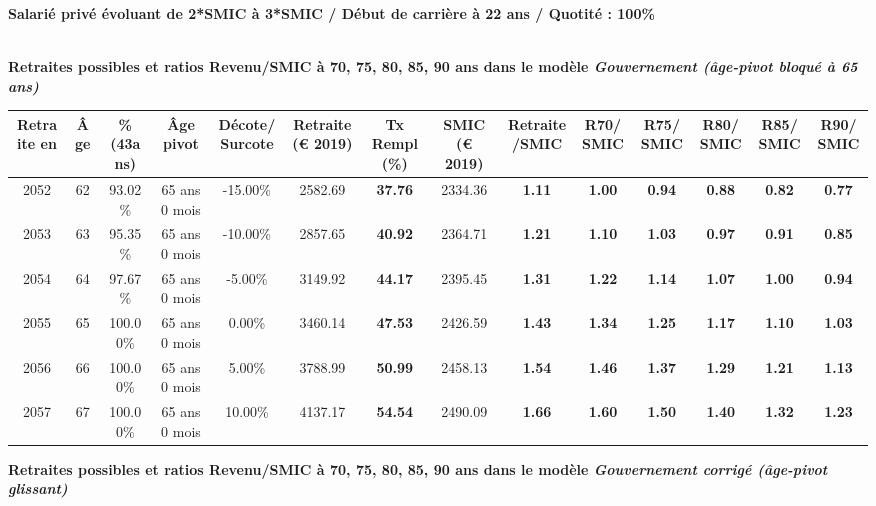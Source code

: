 {\bf \noindent Salarié privé évoluant de 2*SMIC à 3*SMIC / Début de carrière à 22 ans / Quotité : 100\%}  ~ 

 ~\\{\bf \noindent Retraites possibles et ratios Revenu/SMIC à 70, 75, 80, 85, 90 ans dans le modèle \emph{Gouvernement (âge-pivot bloqué à 65 ans)}}  
 
\begin{adjustbox}{max width=\textwidth} 
\begin{tabular}[htb]{|c|c||c|c|c||c|c||c|c||c|c|c|c|c|} 
\hline 
 Retraite en &  Âge &  \%(43ans) &  Âge pivot &  Décote/Surcote &  Retraite (\euro{} 2019) &  Tx Rempl(\%) &  SMIC (\euro{} 2019) &  Retraite/SMIC &  R70/SMIC &  R75/SMIC &  R80/SMIC &  R85/SMIC &  R90/SMIC \\ 
\hline \hline 
 2052 &  62 &  93.02\% &  65 ans 0 mois &  -15.00\% &  2582.69 &  {\bf 37.76} &  2334.36 &  {\bf 1.11} &  {\bf {\color{red} 1.00}} &  {\bf {\color{red} 0.94}} &  {\bf {\color{red} 0.88}} &  {\bf {\color{red} 0.82}} &  {\bf {\color{red} 0.77}} \\ 
\hline 
 2053 &  63 &  95.35\% &  65 ans 0 mois &  -10.00\% &  2857.65 &  {\bf 40.92} &  2364.71 &  {\bf 1.21} &  {\bf 1.10} &  {\bf 1.03} &  {\bf {\color{red} 0.97}} &  {\bf {\color{red} 0.91}} &  {\bf {\color{red} 0.85}} \\ 
\hline 
 2054 &  64 &  97.67\% &  65 ans 0 mois &  -5.00\% &  3149.92 &  {\bf 44.17} &  2395.45 &  {\bf 1.31} &  {\bf 1.22} &  {\bf 1.14} &  {\bf 1.07} &  {\bf 1.00} &  {\bf {\color{red} 0.94}} \\ 
\hline 
 2055 &  65 &  100.00\% &  65 ans 0 mois &  0.00\% &  3460.14 &  {\bf 47.53} &  2426.59 &  {\bf 1.43} &  {\bf 1.34} &  {\bf 1.25} &  {\bf 1.17} &  {\bf 1.10} &  {\bf 1.03} \\ 
\hline 
 2056 &  66 &  100.00\% &  65 ans 0 mois &  5.00\% &  3788.99 &  {\bf 50.99} &  2458.13 &  {\bf 1.54} &  {\bf 1.46} &  {\bf 1.37} &  {\bf 1.29} &  {\bf 1.21} &  {\bf 1.13} \\ 
\hline 
 2057 &  67 &  100.00\% &  65 ans 0 mois &  10.00\% &  4137.17 &  {\bf 54.54} &  2490.09 &  {\bf 1.66} &  {\bf 1.60} &  {\bf 1.50} &  {\bf 1.40} &  {\bf 1.32} &  {\bf 1.23} \\ 
\hline 
\hline 
\end{tabular} 
\end{adjustbox} 
 
 \vspace{0.1cm} 
{\bf \noindent Retraites possibles et ratios Revenu/SMIC à 70, 75, 80, 85, 90 ans dans le modèle \emph{Gouvernement corrigé (âge-pivot glissant)}}  
 
